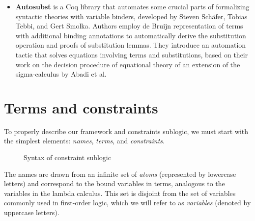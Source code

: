 \documentclass[english, mgr]{iithesis}
\renewcommand{\it}[1]{\textit{#1}}
\begin{document}
\begin{itemize}
\item \textbf{Autosubst}\cite{autosubst}
is a Coq library that automates some crucial parts of formalizing syntactic theories with variable binders,
developed by Steven Schäfer, Tobias Tebbi, and Gert Smolka.
Authors employ de Bruijn representation of terms with additional binding annotations
to automatically derive the substitution operation and proofs of substitution lemmas.
They introduce an automation tactic that solves equations involving terms and substitutions,
based on their work on the decision procedure of equational theory of
an extension of the sigma-calculus by Abadi et al\cite{sigma-calculus}.
\\

\end{itemize}
\chapter{Terms and constraints}
To properly describe our framework and constraints sublogic,
we must start with the simplest elements: \it{names}, \it{terms}, and \it{constraints}.

\begin{figure}[htbp]
  \centering
  \caption{Syntax of constraint sublogic}
  \label{fig:terms-constraints-syntax}
\end{figure}
The names are drawn from an infinite set of \it{atoms} (represented by lowercase letters)
and correspond to the bound variables in terms, analogous to the variables in the lambda calculus.
This set is disjoint from the set of variables commonly used in first-order logic,
which we will refer to as \it{variables} (denoted by uppercase letters).
\end{document}
